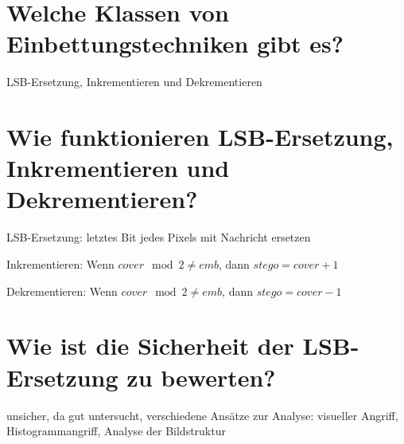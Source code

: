 \documentclass{article}
\begin{document}
	\section*{Welche Klassen von Einbettungstechniken gibt es?}
	LSB-Ersetzung, Inkrementieren und Dekrementieren
	
	\section*{Wie funktionieren LSB-Ersetzung, Inkrementieren und Dekrementieren?}
	LSB-Ersetzung: letztes Bit jedes Pixels mit Nachricht ersetzen
	
	Inkrementieren: Wenn $cover\mod 2 \neq emb$, dann $stego = cover + 1$
	
	Dekrementieren: Wenn $cover\mod 2 \neq emb$, dann $stego = cover - 1$
	
	\section*{Wie ist die Sicherheit der LSB-Ersetzung zu bewerten?}
	unsicher, da gut untersucht, verschiedene Ansätze zur Analyse: visueller Angriff, Histogrammangriff, Analyse der Bildstruktur
	
\end{document}
